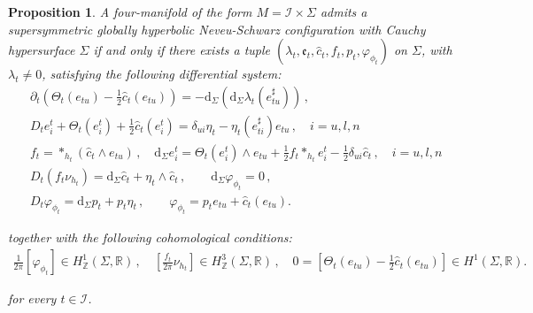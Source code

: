 \documentclass[10pt,reqno,a4paper]{amsart}
\theoremstyle{plain}
\newtheorem{prop}[thm]{Proposition}
\theoremstyle{definition}
\theoremstyle{remark}
\theoremstyle{remark}
\def\dd{\mathrm{d}}
\def\cI{\mathcal{I}}
\def\fre{\mathfrak{e}}
\renewcommand{\(}{ (}
\renewcommand{\)}{ )}
\begin{document}
\begin{prop}
\label{prop:susyevolII}
A four-manifold of the form $M=\cI\times\Sigma$ admits a supersymmetric globally hyperbolic Neveu-Schwarz configuration with Cauchy hypersurface $\Sigma$ if and only if there exists a tuple $(\lambda_t,\fre_t,\widehat{c}_t ,f_t,p_t,\varphi_{\phi_t})$ on $\Sigma$, with $\lambda_t\neq0$, satisfying the following differential system:
\begin{eqnarray*}
& \partial_t(\Theta_t(e_{tu})-\frac{1}{2}\widehat{c}_t (e_{tu}))=-\dd_{\Sigma}(\dd_{\Sigma}\lambda_t(e^{\sharp}_{tu}))\, ,\\
& D_t e^t_i+\Theta_t(e^t_i)+\frac{1}{2}\widehat{c}_t (e^t_i)=\delta_{ui}\eta_t-\eta_t(e^{\sharp}_{ti})e_{tu}\, , \quad i=u,l,n\nonumber \\
& f_t=\ast_{h_t}(\widehat{c}_t \wedge e_{tu})\, , \quad
\dd_{\Sigma}e^t_i=\Theta_t(e^t_i)\wedge e_{tu}+\frac{1}{2}f_t\ast_{h_t}e^t_i-\frac{1}{2}\delta_{ui}\widehat{c}_t \, , \quad i=u,l,n\\
& D_t(f_t\nu_{h_t})=\dd_{\Sigma}\widehat{c}_t +\eta_t\wedge\widehat{c}_t \, , \qquad \dd_{\Sigma}\varphi_{\phi_t}=0\, ,\\
& D_t\varphi_{\phi_t}=\dd_{\Sigma}p_t+p_t\eta_t\, , \qquad \varphi_{\phi_t}=p_t e_{tu}+\widehat{c}_t (e_{tu}).
\end{eqnarray*}
	
\noindent
together with the following cohomological conditions:
\begin{eqnarray*}
\frac{1}{2\pi}[\varphi_{\phi_t}]\in H^1_{\mathbb Z}(\Sigma,\mathbb R)\, , \quad
\left[\frac{f_t}{2\pi}\nu_{h_t}\right]\in H^3_{\mathbb Z}(\Sigma,\mathbb R)\, , \quad
0=[\Theta_t(e_{tu})-\frac{1}{2}\widehat{c}_t (e_{tu})]\in H^1(\Sigma,\mathbb R).
\end{eqnarray*}

\noindent
for every $t\in \cI$. 
\end{prop}
\end{document}
